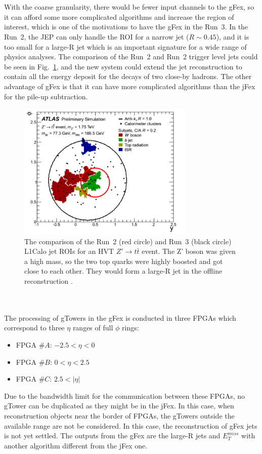 \noindent
\\
\\With the coarse granularity, there would be fewer input channels to the gFex, so it can afford some more complicated algorithms and increase the region of interest, which is one of the motivations to have the gFex in the Run~3. In the Run~2, the JEP can only handle the ROI for a narrow jet ($R\sim 0.45$), and it is too small for a large-R jet which is an important signature for a wide range of physics analyses. The comparison of the Run~2 and Run~2 trigger level jets could be seen in Fig.~\ref{Fig:ZPrimett}, and the new system could extend the jet reconstruction to contain all the energy deposit for the decays of two close-by hadrons. The other advantage of gFex is that it can have more complicated algorithms than the jFex for the pile-up subtraction. 
\begin{figure}[!h]                
	\includegraphics[width=0.75\textwidth]{Chapter6/TrigJetRange.png}
	\begin{center}
		\caption{The comparison of the Run~2 (red circle) and Run~3 (black circle) L1Calo jet ROIs for an HVT $Z'\to t\bar{t}$ event. The Z' boson was given a high mass, so the two top quarks were highly boosted and got close to each other. They would form a large-R jet in the offline reconstruction \cite{Tang:2289434}.  }
		\label{Fig:ZPrimett}            
	\end{center}
\end{figure}
\noindent
\\
\\The processing of gTowers in the gFex is conducted in three FPGAs which correspond to three $\eta$ ranges of full $\phi$ rings:
\begin{itemize}
	\item FPGA $\#A$: $-2.5<\eta<0$
	\item FPGA $\#B$: $0<\eta<2.5$
	\item FPGA $\#C$: $2.5<|\eta|$
\end{itemize}
Due to the bandwidth limit for the communication between these FPGAs, no gTower can be duplicated as they might be in the jFex. In this case, when reconstruction objects near the border of FPGAs, the gTowers outside the available range are not be considered. In this case, the reconstruction of gFex jets is not yet settled. The outputs from the gFex are the large-R jets and $E^{miss}_{T}$ with another algorithm different from the jFex one.
